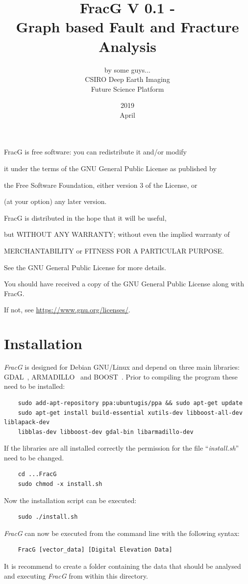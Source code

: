 \documentclass[10pt,a4paper]{article}
\title{\textbf{FracG V 0.1} - \\
Graph based Fault and Fracture Analysis}
\date{2019\\ April}
\author{by some guys...  \\
{\small CSIRO Deep Earth Imaging }\\
{\small Future Science Platform}}
\begin{document}
\maketitle
\newpage
\tableofcontents
\vspace*{\fill}
FracG is free software: you can redistribute it and/or modify

it under the terms of the GNU General Public License as published by

the Free Software Foundation, either version 3 of the License, or

(at your option) any later version.


FracG is distributed in the hope that it will be useful,

but WITHOUT ANY WARRANTY; without even the implied warranty of

MERCHANTABILITY or FITNESS FOR A PARTICULAR PURPOSE.  

See the GNU General Public License for more details.


You should have received a copy of the GNU General Public License along with FracG.  

If not, see \url{https://www.gnu.org/licenses/}.
\newpage
\section{Installation}
\textit{FracG} is designed for Debian GNU/Linux and depend on three main libraries: GDAL~\cite{gdal18}, ARMADILLO~\cite{san16} and BOOST~\cite{sie02, geh16}.
Prior to compiling the program these need to be installed:
\begin{verbatim}
	sudo add-apt-repository ppa:ubuntugis/ppa && sudo apt-get update
	sudo apt-get install build-essential xutils-dev libboost-all-dev liblapack-dev 
	libblas-dev libboost-dev gdal-bin libarmadillo-dev 
\end{verbatim}
If the libraries are all installed correctly the permission for the file ``\textit{install.sh}'' need to be changed.
\begin{verbatim}
	cd ...FracG
	sudo chmod -x install.sh 
\end{verbatim}
Now the installation script can be executed:
\begin{verbatim}
	sudo ./install.sh
\end{verbatim}
\textit{FracG} can now be executed from the command line with the following syntax:
\begin{verbatim}
	FracG [vector_data] [Digital Elevation Data]
\end{verbatim}
It is recommend to create a folder containing the data that should be analysed and executing \textit{FracG} from within this directory.
\end{document}
